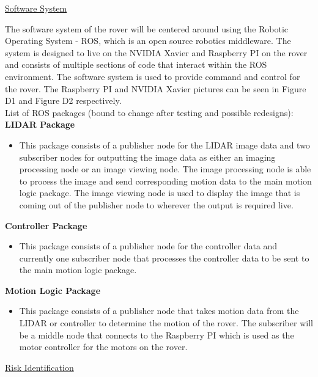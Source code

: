 \documentclass[a4paper, 10pt]{article}
\begin{document}
\underline{Software System}

The software system of the rover will be centered around using the Robotic Operating System - ROS, which is an open source robotics middleware. The system is designed to live on the NVIDIA Xavier and Raspberry PI on the rover and consists of multiple sections of code that interact within the ROS environment. The software system is used to provide command and control for the rover. The Raspberry PI and NVIDIA Xavier pictures can be seen in Figure D1 and Figure D2 respectively. \\

List of ROS packages (bound to change after testing and possible redesigns): \\

\textbf{LIDAR Package}
\begin{itemize}
\item
	This package consists of a publisher node for the LIDAR image data and two subscriber nodes for outputting the image data as either an imaging processing node or an image viewing node. The image processing node is able to process the image and send corresponding motion data to the main motion logic package. The image viewing node is used to display the image that is coming out of the publisher node to wherever the output is required live.
\end{itemize}

\textbf{Controller Package}

\begin{itemize}
\item
	This package consists of a publisher node for the controller data and currently one subscriber node that processes the controller data to be sent to the main motion logic package. 
\end{itemize}

\textbf{Motion Logic Package}

\begin{itemize}
\item
	This package consists of a publisher node that takes motion data from the LIDAR or controller to determine the motion of the rover. The subscriber will be a middle node that connects to the Raspberry PI which is used as the motor controller for the motors on the rover. 
\end{itemize}

\underline{Risk Identification}
\end{document}
